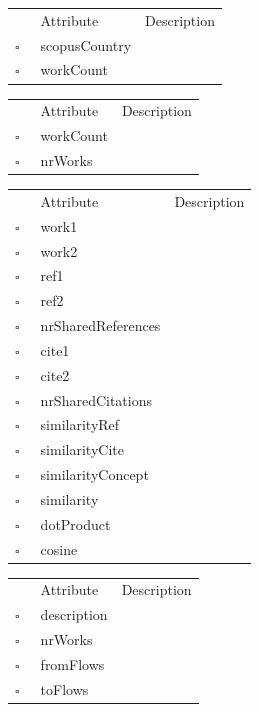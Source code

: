 \begin{table}
\caption{ScopusCity  }

\begin{longtable}{llp{8cm}}
& Attribute & Description \\
$\square$\ & scopusCountry &  \\
$\square$\ & workCount &  \\
\end{longtable}
\label{attr:ScopusCity}
\end{table}

\clearpage
\begin{table}
\caption{ScopusCountry  }

\begin{longtable}{llp{8cm}}
& Attribute & Description \\
$\square$\ & workCount &  \\
$\square$\ & nrWorks &  \\
\end{longtable}
\label{attr:ScopusCountry}
\end{table}

\begin{table}
\caption{Similarity  }

\begin{longtable}{llp{8cm}}
& Attribute & Description \\
$\square$\ & work1 &  \\
$\square$\ & work2 &  \\
$\square$\ & ref1 &  \\
$\square$\ & ref2 &  \\
$\square$\ & nrSharedReferences &  \\
$\square$\ & cite1 &  \\
$\square$\ & cite2 &  \\
$\square$\ & nrSharedCitations &  \\
$\square$\ & similarityRef &  \\
$\square$\ & similarityCite &  \\
$\square$\ & similarityConcept &  \\
$\square$\ & similarity &  \\
$\square$\ & dotProduct &  \\
$\square$\ & cosine &  \\
\end{longtable}
\label{attr:Similarity}
\end{table}

\begin{table}
\caption{SourceGroup  }

\begin{longtable}{llp{8cm}}
& Attribute & Description \\
$\square$\ & description &  \\
$\square$\ & nrWorks &  \\
$\square$\ & fromFlows &  \\
$\square$\ & toFlows &  \\
\end{longtable}
\label{attr:SourceGroup}
\end{table}

